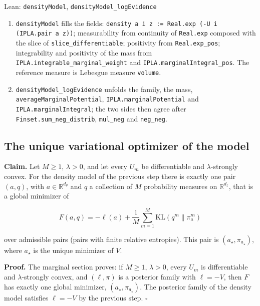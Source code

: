 \documentclass[11pt,a4paper]{report}
\begin{document}
\begin{leanbox}{Lean: \texttt{densityModel}, \texttt{densityModel\_\allowbreak{}logEvidence}}
\begin{enumerate}
\item \texttt{density\allowbreak{}Model} fills the fields: \texttt{density a i z := Real.\allowbreak{}exp (-\allowbreak{}U i (IPLA.\allowbreak{}pair a z))}; measurability from continuity of \texttt{Real.\allowbreak{}exp} composed with the slice of \texttt{slice\_\allowbreak{}differentiable}; positivity from \texttt{Real.\allowbreak{}exp\_\allowbreak{}pos}; integrability and positivity of the mass from \texttt{IPLA.\allowbreak{}integrable\_\allowbreak{}marginal\_\allowbreak{}weight} and \texttt{IPLA.\allowbreak{}marginal\allowbreak{}Integral\_\allowbreak{}pos}. The reference measure is Lebesgue measure \texttt{volume}.

\item \texttt{density\allowbreak{}Model\_\allowbreak{}log\allowbreak{}Evidence} unfolds the family, the mass, \texttt{average\allowbreak{}Marginal\allowbreak{}Potential}, \texttt{IPLA.\allowbreak{}marginal\allowbreak{}Potential} and \texttt{IPLA.\allowbreak{}marginal\allowbreak{}Integral}; the two sides then agree after \texttt{Finset.\allowbreak{}sum\_\allowbreak{}neg\_\allowbreak{}distrib}, \texttt{mul\_\allowbreak{}neg} and \texttt{neg\_\allowbreak{}neg}.

\end{enumerate}
\end{leanbox}
\subsection{\texorpdfstring{The unique variational optimizer of the model}{The unique variational optimizer of the model}}


\textbf{Claim.} Let \(M\ge1\), \(\lambda>0\), and let every \(U_m\) be differentiable and \(\lambda\)-strongly convex. For the density model of the previous step there is exactly one pair \((a,q)\), with \(a\in\mathbb R^{d_\theta}\) and \(q\) a collection of \(M\) probability measures on \(\mathbb R^{d_z}\), that is a global minimizer of


\[F(a,q)=-\ell(a)+\frac1M\sum_{m=1}^M\mathrm{KL}(q^m\|\pi_a^m)\]


over admissible pairs (pairs with finite relative entropies). This pair is \((a_\star,\pi_{a_\star})\), where \(a_\star\) is the unique minimizer of \(V\).




\textbf{Proof.} The marginal section proves: if \(M\ge1\), \(\lambda>0\), every \(U_m\) is differentiable and \(\lambda\)-strongly convex, and \((\ell,\pi)\) is a posterior family with \(\ell=-V\), then \(F\) has exactly one global minimizer, \((a_\star,\pi_{a_\star})\). The posterior family of the density model satisfies \(\ell=-V\) by the previous step. \(\square\)
\end{document}
